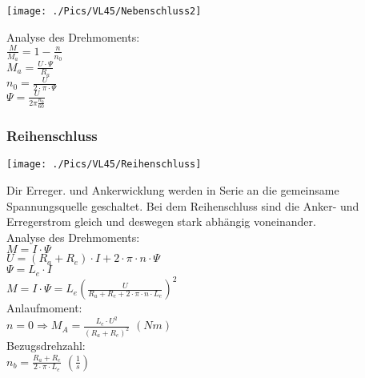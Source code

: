 \begin{minipage}{0.4 \linewidth}
\texttt{[image: ./Pics/VL45/Nebenschluss2]}
\end{minipage}
\begin{minipage}{0.6 \linewidth}
Analyse des Drehmoments: \\

$\frac{M}{M_a} = 1 - \frac{n}{n_0}$\\

$M_a = \frac{U \cdot \Psi}{R_a}$\\

$n_0 = \frac{U}{2 \cdot \pi \cdot \Psi}$ \\

$\Psi = \frac{U}{2 \pi \frac{n_0}{60}} $ 
\end{minipage}

\subsubsection{Reihenschluss}
\begin{minipage}{0.3 \linewidth}
\texttt{[image: ./Pics/VL45/Reihenschluss]}
\end{minipage}
\begin{minipage}{0.7 \linewidth}
Dir Erreger. und Ankerwicklung werden in Serie an die gemeinsame Spannungsquelle geschaltet. Bei dem Reihenschluss sind die Anker- und Erregerstrom gleich und deswegen stark abhängig voneinander. \\

Analyse des Drehmoments: \\

$M = I \cdot \Psi$ \\

$U = (R_a + R_e) \cdot I + 2 \cdot \pi \cdot n \cdot \Psi$ \\

$\Psi = L_e \cdot I$ \\

$M = I \cdot \Psi = L_e (\frac{U}{R_a + R_e + 2 \cdot \pi \cdot n \cdot L_e})^2$ \\

Anlaufmoment: \\

$n = 0 \Rightarrow M_A = \frac{L_e \cdot U^2}{(R_a + R_e)^2}$   $(Nm)$ \\

Bezugsdrehzahl: \\

$n_b = \frac{R_a + R_e}{2 \cdot \pi \cdot L_e}$   $(\frac{1}{s})$
\end{minipage}

